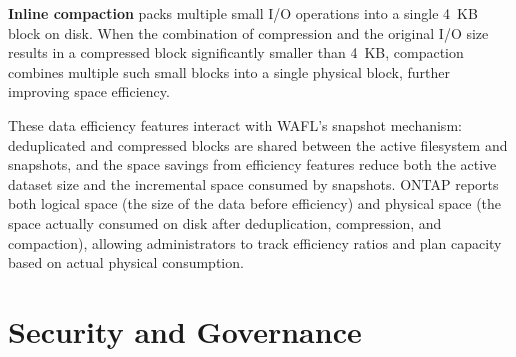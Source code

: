 \textbf{Inline compaction} packs multiple small I/O operations into a single 4~KB block on disk. When the combination of compression and the original I/O size results in a compressed block significantly smaller than 4~KB, compaction combines multiple such small blocks into a single physical block, further improving space efficiency.

These data efficiency features interact with WAFL's snapshot mechanism: deduplicated and compressed blocks are shared between the active filesystem and snapshots, and the space savings from efficiency features reduce both the active dataset size and the incremental space consumed by snapshots. ONTAP reports both logical space (the size of the data before efficiency) and physical space (the space actually consumed on disk after deduplication, compression, and compaction), allowing administrators to track efficiency ratios and plan capacity based on actual physical consumption.

\section{Security and Governance}


